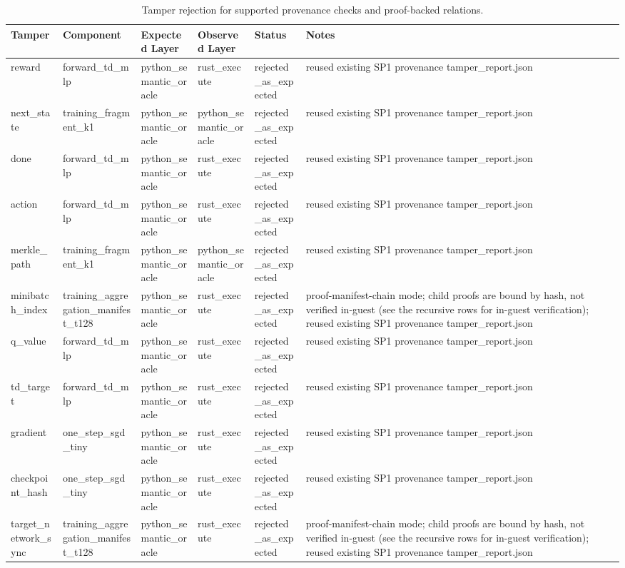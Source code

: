 \begin{table}[t]
\centering
\caption{Tamper rejection for supported provenance checks and proof-backed relations.}
\label{tab:tamper-rejection}
\begin{tabular}{llllll}
\toprule
Tamper & Component & Expected Layer & Observed Layer & Status & Notes \\
\midrule
reward & forward\_td\_mlp & python\_semantic\_oracle & rust\_execute & rejected\_as\_expected & reused existing SP1 provenance tamper\_report.json \\
next\_state & training\_fragment\_k1 & python\_semantic\_oracle & python\_semantic\_oracle & rejected\_as\_expected & reused existing SP1 provenance tamper\_report.json \\
done & forward\_td\_mlp & python\_semantic\_oracle & rust\_execute & rejected\_as\_expected & reused existing SP1 provenance tamper\_report.json \\
action & forward\_td\_mlp & python\_semantic\_oracle & rust\_execute & rejected\_as\_expected & reused existing SP1 provenance tamper\_report.json \\
merkle\_path & training\_fragment\_k1 & python\_semantic\_oracle & python\_semantic\_oracle & rejected\_as\_expected & reused existing SP1 provenance tamper\_report.json \\
minibatch\_index & training\_aggregation\_manifest\_t128 & python\_semantic\_oracle & rust\_execute & rejected\_as\_expected & proof-manifest-chain mode; child proofs are bound by hash, not verified in-guest (see the recursive rows for in-guest verification); reused existing SP1 provenance tamper\_report.json \\
q\_value & forward\_td\_mlp & python\_semantic\_oracle & rust\_execute & rejected\_as\_expected & reused existing SP1 provenance tamper\_report.json \\
td\_target & forward\_td\_mlp & python\_semantic\_oracle & rust\_execute & rejected\_as\_expected & reused existing SP1 provenance tamper\_report.json \\
gradient & one\_step\_sgd\_tiny & python\_semantic\_oracle & rust\_execute & rejected\_as\_expected & reused existing SP1 provenance tamper\_report.json \\
checkpoint\_hash & one\_step\_sgd\_tiny & python\_semantic\_oracle & rust\_execute & rejected\_as\_expected & reused existing SP1 provenance tamper\_report.json \\
target\_network\_sync & training\_aggregation\_manifest\_t128 & python\_semantic\_oracle & rust\_execute & rejected\_as\_expected & proof-manifest-chain mode; child proofs are bound by hash, not verified in-guest (see the recursive rows for in-guest verification); reused existing SP1 provenance tamper\_report.json \\

\end{tabular}
\end{table}
